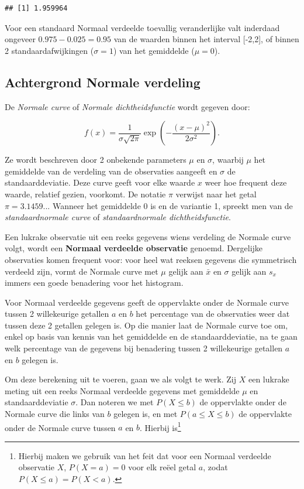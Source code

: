 \documentclass[
  12pt,dutch]{book}
\theoremstyle{definition}
\theoremstyle{definition}
\theoremstyle{definition}
\theoremstyle{definition}
\theoremstyle{remark}
\begin{document}
\begin{verbatim}
## [1] 1.959964
\end{verbatim}

Voor een standaard Normaal verdeelde toevallig veranderlijke valt inderdaad ongeveer \(0.975 - 0.025=0.95\) van de waarden binnen het interval {[}-2,2{]}, of binnen 2 standaardafwijkingen (\(\sigma=1\)) van het gemiddelde (\(\mu=0\)).

\subsection{Achtergrond Normale verdeling}\label{subsec:normalcalc}

De \emph{Normale curve} of \emph{Normale dichtheidsfunctie} wordt gegeven door:

\begin{equation*}
f(x) = \frac{1}{\sigma \sqrt{2 \pi} } \exp \left ( - \frac{ (x - \mu)^2 }{ 2
\sigma^2} \right ).
\end{equation*}

Ze wordt beschreven door 2 onbekende parameters \(\mu\) en \(\sigma\), waarbij \(\mu\) het gemiddelde van de verdeling van de observaties aangeeft en \(\sigma\)
de standaarddeviatie. Deze curve geeft voor elke waarde \(x\) weer hoe
frequent deze waarde, relatief gezien, voorkomt. De notatie \(\pi\) verwijst
naar het getal \(\pi=3.1459...\) Wanneer het gemiddelde 0 is en de variantie
1, spreekt men van de \emph{standaardnormale curve} of \emph{standaardnormale dichtheidsfunctie}.

Een lukrake observatie uit een reeks gegevens wiens verdeling de Normale
curve volgt, wordt een \textbf{Normaal verdeelde observatie} genoemd.
Dergelijke observaties komen frequent voor: voor heel wat reeksen gegevens
die symmetrisch verdeeld zijn, vormt de Normale curve met \(\mu\) gelijk aan \(\bar x\) en \(\sigma\) gelijk aan \(s_x\) immers een goede benadering voor het
histogram.

Voor Normaal verdeelde gegevens geeft de oppervlakte onder de Normale curve
tussen 2 willekeurige getallen \(a\) en \(b\) het percentage van de
observaties weer dat tussen deze 2 getallen gelegen is. Op die manier laat de
Normale curve toe om, enkel op basis van kennis van het gemiddelde en de
standaarddeviatie, na te gaan welk percentage van de gegevens bij benadering
tussen 2 willekeurige getallen \(a\) en \(b\) gelegen is.

Om deze berekening uit te voeren, gaan we als volgt te werk. Zij \(X\) een
lukrake meting uit een reeks Normaal verdeelde gegevens met gemiddelde \(\mu\)
en standaarddeviatie \(\sigma\). Dan noteren we met \(P(X\leq b)\) de
oppervlakte onder de Normale curve die links van \(b\) gelegen is, en met \(P(a\leq X\leq b)\) de oppervlakte onder de Normale curve tussen \(a\) en \(b\).
Hierbij is\footnote{Hierbij maken we gebruik van het feit dat voor een Normaal verdeelde observatie \(X\), \(P(X=a)=0\) voor elk reëel getal \(a\), zodat \(P(X\leq a)=P(X<a)\).}
\end{document}
